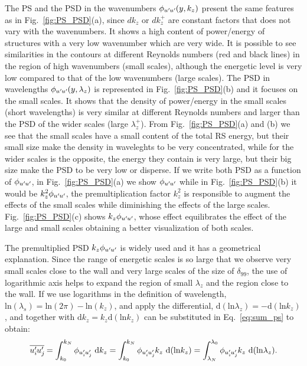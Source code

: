 The PS and the PSD in the wavenumbers $\phi_{u^{\prime}\mkern-1.2mu u^{\prime}\mkern-1.2mu}(y,k_z)$ present the same features as in Fig.~\ref{fig:PS_PSD}(a), since $dk_z$ or $dk_z^+$ are constant factors that does not vary with the wavenumbers. It shows a high content of power/energy of structures with a very low wavenumber which are very wide. It is possible to see similarities in the contours at different Reynolds numbers (red and black lines) in the region of high wavenumbers (small scales), although the energetic level is very low compared to that of the low wavenumbers (large scales).
The PSD in wavelengths $\phi_{u^{\prime}\mkern-1.2mu u^{\prime}\mkern-1.2mu}(y,\lambda_z)$ is represented in Fig.~\ref{fig:PS_PSD}(b) and it focuses on the small scales. It shows that the density of power/energy in the small scales (short wavelengths) is very similar at different Reynolds numbers and larger than the PSD of the wider scales (large $\lambda_z^+$). 
From Fig.~\ref{fig:PS_PSD}(a) and (b) we see that the small scales have a small content of the total RS energy, but their small size make the density in waveleghts to be very concentrated, while for the wider scales is the opposite, the energy they contain is very large, but their big size make the PSD to be very low or disperse.
If we write both PSD as a function of $\phi_{u^{\prime}\mkern-1.2mu u^{\prime}\mkern-1.2mu}$, in Fig.~\ref{fig:PS_PSD}(a) we show $\phi_{u^{\prime}\mkern-1.2mu u^{\prime}\mkern-1.2mu}$ while in Fig.~\ref{fig:PS_PSD}(b) it would be $k_z^2 \phi_{u^{\prime}\mkern-1.2mu u^{\prime}\mkern-1.2mu}$, the premultiplication factor $k_z^2$ is responsible to augment the effects of the small scales while diminishing the effects of the large scales. Fig.~\ref{fig:PS_PSD}(c) shows $k_z \phi_{u^{\prime}\mkern-1.2mu u^{\prime}\mkern-1.2mu}$, whose effect equilibrates the effect of the large and small scales obtaining a better visualization of both scales.

The premultiplied PSD $k_z \phi_{u^{\prime}\mkern-1.2mu u^{\prime}\mkern-1.2mu}$ is widely used and it has a geometrical explanation.
Since the range of energetic scales is so large that we observe very small scales close to the wall and very large scales of the size of $\delta_99$, the use of logarithmic axis helps to expand the region of small $\lambda_z$ and the region close to the wall.
If we use logarithms in the definition of wavelength, $ \mathrm{ln}(\lambda_s) = \mathrm{ln}(2\pi) - \mathrm{ln}(k_z)$, and apply the differential, $\mathrm{d}(\mathrm{ln} \lambda_z) = -\mathrm{d}(\mathrm{ln} k_z)$, and together with $\mathrm{d}k_z = k_z \mathrm{d}(\mathrm{ln} k_z)$ can be substituted in Eq.~\ref{eq:sum_ps} to obtain:
\begin{equation}
    \overline{u_i^{\prime}\mkern-1.2mu u_j^{\prime}\mkern-1.2mu} = 
    \int_{k_0}^{k_{N}}   \phi_{u_i^{\prime}\mkern-1.2mu u_j^{\prime}\mkern-1.2mu}  ~ \mathrm{d} k_z = 
    \int_{k_0}^{k_{N}}   \phi_{u_i^{\prime}\mkern-1.2mu u_j^{\prime}\mkern-1.2mu} k_z  ~ \mathrm{d}( \mathrm{ln} k_z) = 
    \int^{\lambda_0}_{\lambda_{N}}   \phi_{u_i^{\prime}\mkern-1.2mu u_j^{\prime}\mkern-1.2mu} k_z ~ \mathrm{d}( \mathrm{ln} \lambda_z).
\end{equation}

